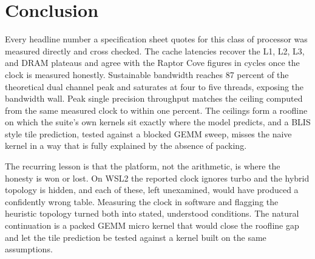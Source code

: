 \chapter{Conclusion}

Every headline number a specification sheet quotes for this class of processor
was measured directly and cross checked. The cache latencies recover the L1, L2,
L3, and DRAM plateaus and agree with the Raptor Cove figures in cycles once the
clock is measured honestly. Sustainable bandwidth reaches 87 percent of the
theoretical dual channel peak and saturates at four to five threads, exposing
the bandwidth wall. Peak single precision throughput matches the ceiling
computed from the same measured clock to within one percent. The ceilings form a
roofline on which the suite's own kernels sit exactly where the model predicts,
and a BLIS style tile prediction, tested against a blocked GEMM sweep, misses the
naive kernel in a way that is fully explained by the absence of packing.

The recurring lesson is that the platform, not the arithmetic, is where the
honesty is won or lost. On WSL2 the reported clock ignores turbo and the hybrid
topology is hidden, and each of these, left unexamined, would have produced a
confidently wrong table. Measuring the clock in software and flagging the
heuristic topology turned both into stated, understood conditions. The natural
continuation is a packed GEMM micro kernel that would close the roofline gap and
let the tile prediction be tested against a kernel built on the same assumptions.
